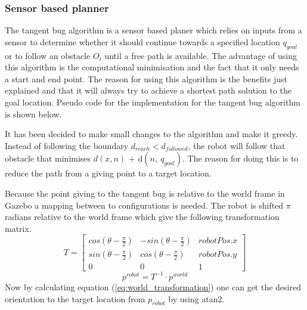\documentclass[../Head/Main.tex]{subfiles}
\begin{document}
\subsubsection{Sensor based planner}
The tangent bug algorithm is a sensor based planer which relies on inputs from a sensor to determine whether it should continue towards a  specified location $q_{goal}$ or to follow an obstacle $O_i$ until a free path is available. The advantage of using this algorithm is the computational minimisation and the fact that it only needs a start and end point. The reason for using this algorithm is the benefits just explained and that it will always try to achieve a shortest path solution to the goal location. Pseudo code for the implementation for the tangent bug algorithm is shown below.        

It has been decided to make small changes to the algorithm and make it greedy. Instead of following the boundary $d_{reach} < d_{followed}$, the robot will follow that obstacle that minimises ${d(x,n)}$ + d$\left(n,~q_{goal}\right)$. The reason for doing this is to reduce the path from a giving point to a target location. \par
Because the point giving to the tangent bug is relative to the world frame in Gazebo a mapping between to configurations is needed. The robot is shifted $\pi$ radians relative to the world frame which give the following transformation matrix.
\begin{equation}
	T = \begin{bmatrix} 
	   cos(\theta-\frac{\pi}{2}) &  -sin(\theta-\frac{\pi}{2}) & robotPos.x \\ 
	    sin(\theta-\frac{\pi}{2}) &  cos(\theta-\frac{\pi}{2}) & robotPos.y \\
	    0 & 0 & 1					
	\end{bmatrix}
\end{equation}
\begin{equation}\label{eq:world_transformation}
	p^{robot} = T^{-1} \cdot {p^{world}}
\end{equation}	
Now by calculating equation (\ref{eq:world_transformation}) one can get the desired orientation to the target location from $p_{robot}$ by using atan2.
\end{document}

